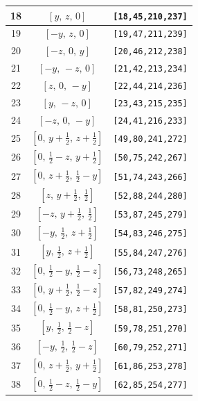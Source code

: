 \documentclass[fleqn,8pt]{jsarticle}
\begin{document}
\begin{longtable}{ccc}
18 & $\left[ y,\, z,\, 0 \right]$ & {\tt [18,45,210,237]} \\ \hline
19 & $\left[ - y,\, z,\, 0 \right]$ & {\tt [19,47,211,239]} \\ \hline
20 & $\left[ - z,\, 0,\, y \right]$ & {\tt [20,46,212,238]} \\ \hline
21 & $\left[ - y,\, - z,\, 0 \right]$ & {\tt [21,42,213,234]} \\ \hline
22 & $\left[ z,\, 0,\, - y \right]$ & {\tt [22,44,214,236]} \\ \hline
23 & $\left[ y,\, - z,\, 0 \right]$ & {\tt [23,43,215,235]} \\ \hline
24 & $\left[ - z,\, 0,\, - y \right]$ & {\tt [24,41,216,233]} \\ \hline
25 & $\left[ 0,\, y + \frac{1}{2},\, z + \frac{1}{2} \right]$ & {\tt [49,80,241,272]} \\ \hline
26 & $\left[ 0,\, \frac{1}{2} - z,\, y + \frac{1}{2} \right]$ & {\tt [50,75,242,267]} \\ \hline
27 & $\left[ 0,\, z + \frac{1}{2},\, \frac{1}{2} - y \right]$ & {\tt [51,74,243,266]} \\ \hline
28 & $\left[ z,\, y + \frac{1}{2},\, \frac{1}{2} \right]$ & {\tt [52,88,244,280]} \\ \hline
29 & $\left[ - z,\, y + \frac{1}{2},\, \frac{1}{2} \right]$ & {\tt [53,87,245,279]} \\ \hline
30 & $\left[ - y,\, \frac{1}{2},\, z + \frac{1}{2} \right]$ & {\tt [54,83,246,275]} \\ \hline
31 & $\left[ y,\, \frac{1}{2},\, z + \frac{1}{2} \right]$ & {\tt [55,84,247,276]} \\ \hline
32 & $\left[ 0,\, \frac{1}{2} - y,\, \frac{1}{2} - z \right]$ & {\tt [56,73,248,265]} \\ \hline
33 & $\left[ 0,\, y + \frac{1}{2},\, \frac{1}{2} - z \right]$ & {\tt [57,82,249,274]} \\ \hline
34 & $\left[ 0,\, \frac{1}{2} - y,\, z + \frac{1}{2} \right]$ & {\tt [58,81,250,273]} \\ \hline
35 & $\left[ y,\, \frac{1}{2},\, \frac{1}{2} - z \right]$ & {\tt [59,78,251,270]} \\ \hline
36 & $\left[ - y,\, \frac{1}{2},\, \frac{1}{2} - z \right]$ & {\tt [60,79,252,271]} \\ \hline
37 & $\left[ 0,\, z + \frac{1}{2},\, y + \frac{1}{2} \right]$ & {\tt [61,86,253,278]} \\ \hline
38 & $\left[ 0,\, \frac{1}{2} - z,\, \frac{1}{2} - y \right]$ & {\tt [62,85,254,277]} \\ \hline

\end{longtable}
\end{document}
